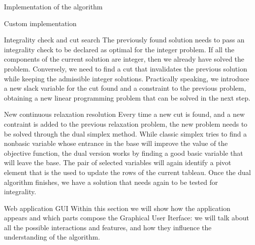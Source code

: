 \documentclass[9pt]{extarticle}
\begin{document}
\begin{section}{Implementation of the algorithm}
\begin{subsection}{Custom implementation}
            \begin{subsubsection}{Integrality check and cut search}
                The previously found solution needs to pass an integrality check to be declared as optimal for the integer problem.
                If all the components of the current solution are integer, then we already have solved the problem.
                Conversely, we need to find a cut that invalidates the previous solution while keeping the admissible integer solutions.
                Practically speaking, we introduce a new slack variable for the cut found and a constraint to the previous problem,
                obtaining a new linear programming problem that can be solved in the next step.
            \end{subsubsection}

            \begin{subsubsection}{New continuous relaxation resolution}
                Every time a new cut is found, and a new contraint is added to the previous relaxation problem, the new problem needs to be solved
                through the dual simplex method.
                While classic simplex tries to find a nonbasic variable whose entrance in the base will improve the value of the objective function,
                the dual version works by finding a good basic variable that will leave the base.
                The pair of selected variables will again identify a pivot element that is the used to update the rows of the current tableau.
                Once the dual algorithm finishes, we have a solution that needs again to be tested for integrality.
            \end{subsubsection}
        \end{subsection}

        \begin{subsection}{Web application GUI}
            Within this section we will show how the application appears and which parts compose the Graphical User Iterface:
            we will talk about all the possible interactions and features, and how they influence the understanding of the 
            algorithm.
            

\end{subsection}
\end{section}
\end{document}
